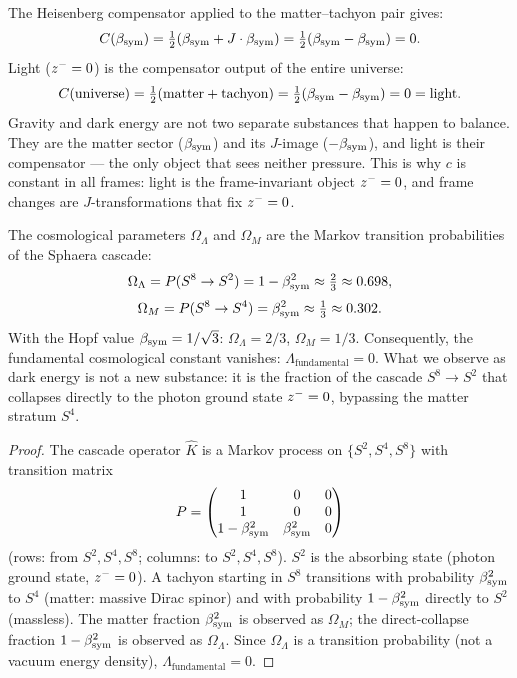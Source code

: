 \begin{remark}
The Heisenberg compensator applied to the matter--tachyon pair gives:
\[
  C(\beta_{\mathrm{sym}}) = \tfrac{1}{2}(\beta_{\mathrm{sym}}+J\cdot\beta_{\mathrm{sym}})
           = \tfrac{1}{2}(\beta_{\mathrm{sym}}-\beta_{\mathrm{sym}}) = 0.
\]
Light ($z^-=0$) is the compensator output of the entire universe:
\[
  C(\mathrm{universe})
  = \tfrac{1}{2}(\mathrm{matter}+\mathrm{tachyon})
  = \tfrac{1}{2}(\beta_{\mathrm{sym}}-\beta_{\mathrm{sym}}) = 0 = \mathrm{light}.
\]
Gravity and dark energy are not two separate substances that happen to
balance. They are the matter sector ($\beta_{\mathrm{sym}}$) and its $J$-image
($-\beta_{\mathrm{sym}}$), and light is their compensator --- the only object that
sees neither pressure.
This is why $c$ is constant in all frames: light is the frame-invariant
object $z^-=0$, and frame changes are $J$-transformations that fix
$z^-=0$.
\end{remark}

\begin{theorem}[Dark energy as cascade probability; $\Lambda=0$]
\label{thm:dark-energy}
The cosmological parameters $\Omega_\Lambda$ and $\Omega_M$ are the
Markov transition probabilities of the Sphaera cascade:
\[
  \Omega_\Lambda = P(S^8\to S^2) = 1-\beta_{\mathrm{sym}}^2\approx\tfrac{2}{3}\approx 0.698,
\]
\[
  \Omega_M = P(S^8\to S^4) = \beta_{\mathrm{sym}}^2\approx\tfrac{1}{3}\approx 0.302.
\]
With the Hopf value $\beta_{\mathrm{sym}}=1/\sqrt{3}$:
$\Omega_\Lambda=2/3$, $\Omega_M=1/3$.
Consequently, the fundamental cosmological constant vanishes:
$\Lambda_{\mathrm{fundamental}}=0$.
What we observe as dark energy is not a new substance: it is the
fraction of the cascade $S^8\to S^2$ that collapses directly to the
photon ground state $z^-=0$, bypassing the matter stratum $S^4$.
\end{theorem}

\begin{proof}
The cascade operator $\hat{K}$ is a Markov process on $\{S^2,S^4,S^8\}$
with transition matrix
\[
  P = \begin{pmatrix} 1 & 0 & 0 \\ 1 & 0 & 0 \\ 1-\beta_{\mathrm{sym}}^2 & \beta_{\mathrm{sym}}^2 & 0 \end{pmatrix}
\]
(rows: from $S^2,S^4,S^8$; columns: to $S^2,S^4,S^8$).
$S^2$ is the absorbing state (photon ground state, $z^-=0$).
A tachyon starting in $S^8$ transitions with probability $\beta_{\mathrm{sym}}^2$ to
$S^4$ (matter: massive Dirac spinor) and with probability $1-\beta_{\mathrm{sym}}^2$
directly to $S^2$ (massless).
The matter fraction $\beta_{\mathrm{sym}}^2$ is observed as $\Omega_M$; the
direct-collapse fraction $1-\beta_{\mathrm{sym}}^2$ is observed as $\Omega_\Lambda$.
Since $\Omega_\Lambda$ is a transition probability (not a vacuum energy
density), $\Lambda_{\mathrm{fundamental}}=0$.
\end{proof}

